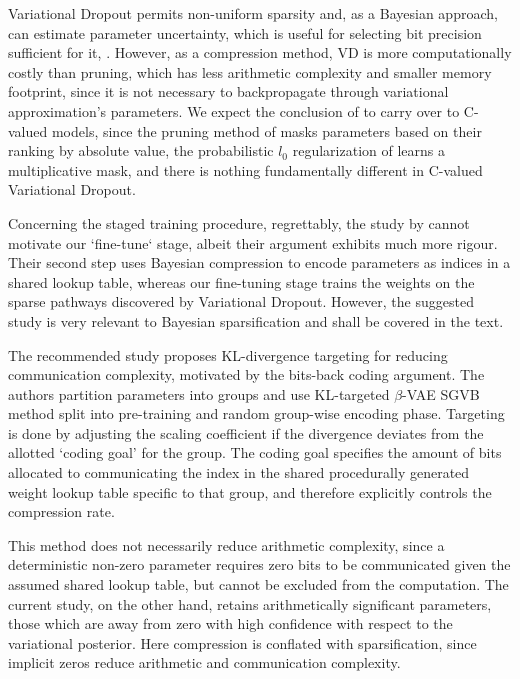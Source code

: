 \documentclass[10pt,a4paper,draft]{article}
\begin{document}
Variational Dropout permits non-uniform sparsity and, as a Bayesian approach, can estimate
parameter uncertainty, which is useful for selecting bit precision sufficient for it,
\cite{louizos_bayesian_2017}. However, as a compression method, VD is more computationally
costly than pruning, which has less arithmetic complexity and smaller memory footprint,
since it is not necessary to backpropagate through variational approximation's parameters.
We expect the conclusion of \cite{gale_state_2019} to carry over to C-valued models, since
the pruning method of \cite{zhu_prune_2018} masks parameters based on their ranking by
absolute value, the probabilistic $l_0$ regularization of \cite{louizos_learning_2018}
learns a multiplicative mask, and there is nothing fundamentally different in C-valued
Variational Dropout.

Concerning the staged training procedure, regrettably, the study by \cite{havasi_minimal_2018}
cannot motivate our `fine-tune` stage, albeit their argument exhibits much more rigour.
Their second step uses Bayesian compression to encode parameters as indices in a shared
lookup table, whereas our fine-tuning stage trains the weights on the sparse pathways
discovered by Variational Dropout. However, the suggested study is very relevant to Bayesian
sparsification and shall be covered in the text.

The recommended study \cite{havasi_minimal_2018} proposes KL-divergence targeting for reducing
communication complexity, motivated by the bits-back coding argument. The authors partition
parameters into groups and use KL-targeted $\beta$-VAE SGVB method split into pre-training
and random group-wise encoding phase. Targeting is done by adjusting the scaling coefficient
if the divergence deviates from the allotted `coding goal' for the group. The coding goal
specifies the amount of bits allocated to communicating the index in the shared procedurally
generated weight lookup table specific to that group, and therefore explicitly controls the
compression rate.

This method does not necessarily reduce arithmetic complexity, since a deterministic
non-zero parameter requires zero bits to be communicated given the assumed shared lookup
table, but cannot be excluded from the computation. The current study, on the other hand,
retains arithmetically significant parameters, those which are away from zero with high
confidence with respect to the variational posterior. Here compression is conflated with
sparsification, since implicit zeros reduce arithmetic and communication complexity.
\end{document}
